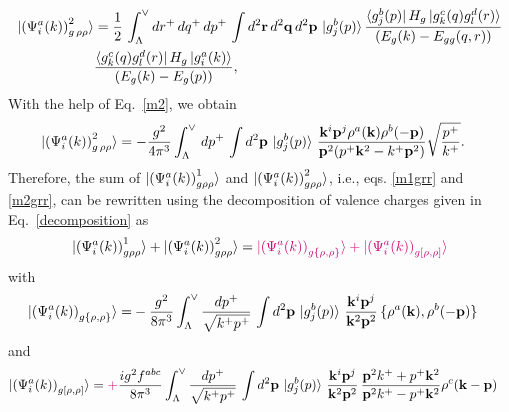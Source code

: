 \documentclass[a4paper,11pt]{article}
\def\v#1{\mathbf{#1}}
\begin{document}
\begin{figure}[htbp]
    \centering
\end{figure}
\begin{align}
\ket{\left(\Psi^{a}_{i}(k) \right)^{2}_{g\, \rho \rho}} 
   & =
   \frac{1}{2}\,\int_{\Lambda}^{\vee} d r^+\,  dq^+\,  dp^+\,
   \int d^2 \v{r}\, d^2\v{q}\, d^2\v{p}\,
   \ket{g_{j}^{b}(p)}
   \frac{\bra{g_{j}^{b}(p)}H_{g}\ket{g_{k}^{c}(q)g_{l}^{d}(r)}}{(E_{g}(k)-E_{gg}(q,r))}\notag \\ & \frac{\bra{g_{k}^{c}(q)g_{l}^{d}(r)}H_{g}\ket{g_{i}^{a}(k)}}{(E_{g}(k)-E_{g}(p))},
   \end{align}
With the help of Eq.~\eqref{m2}, we obtain
   \begin{align}
  \ket{\left(\Psi^{a}_{i}(k) \right)^{2}_{g\, \rho \rho}} 
   & = - \frac{g^2}{4\pi^3}
  \int_{\Lambda}^{\vee}\, dp^{+} \,
   \int d^{2}\v{p}\, \ket{g_{j}^{b}(p)}\, 
    \frac{\v{k}^{i}\v{p}^{j}\rho^{a}(\v{k})\rho^{b}(-\v{p}) }{\v{p}^{2}(p^{+}\v{k}^{2}-k^{+}\v{p}^{2})}\sqrt{\frac{p^{+}}{k^{+}}}.
   \label{m2grr}
\end{align}
Therefore, the sum of $\ket{ \left(\Psi^{a}_{i}(k) \right)^{1}_{g \rho \rho} }$ and  $\ket{ \left(\Psi^{a}_{i}(k) \right)^{2}_{g \rho \rho} }$, i.e., eqs. \eqref{m1grr} and \eqref{m2grr}, can be rewritten using the decomposition of valence charges given in Eq.~\eqref{decomposition} as 
\begin{align}
\ket{ \left(\Psi^{a}_{i}(k) \right)^{1}_{g \rho \rho} }
+\ket{ \left(\Psi^{a}_{i}(k) \right)^{2}_{g \rho \rho} }  = 
{\color{chg}\ket{ \left(\Psi^{a}_{i}(k) \right)_{g \{\rho, \rho\} } }
+\ket{ \left(\Psi^{a}_{i}(k) \right)_{g [\rho, \rho] } }}  
\end{align}
with 
\begin{align}\label{onegrho3mom}
\ket{ \left(\Psi^{a}_{i}(k) \right)_{g \{\rho, \rho\} } }
 = &  
 - \frac{g^2}{8\pi^3}
  \int_{\Lambda}^{\vee}\frac{dp^{+}}{\sqrt{k^{+}p^{+}}}\, \int d^2\v{p}\,\ket{g_{j}^{b}(p)}\,\frac{\v{k}^{i}\v{p}^{j}} {\v{k}^{2} \v{p}^2 }\,
  \{\rho^{a}(\v{k}),\rho^{b}(-\v{p}) \}
\end{align}
and 
\begin{align}\label{onegrho4mom}
  \ket{ \left(\Psi^{a}_{i}(k) \right)_{g [\rho, \rho] } }
 & = 
 {\color{chg}+} \frac{ig^2 f^{abc}}{8\pi^3}
 \int_{\Lambda}^{\vee}\frac{dp^{+}}{\sqrt{k^{+}p^{+}}}\,\int d^2\v{p}\, \ket{g_{j}^{b}(p)}\, \frac{\v{k}^{i}\v{p}^{j}} {\v{k}^{2} \v{p}^2 }\,\frac{\v{p}^2 k^{+}+ p^{+} \v{k}^2}{\v{p}^2 k^{+}- p^{+} \v{k}^2}  \rho^{c}(\v{k} -\v{p}) 
\end{align}
\end{document}
